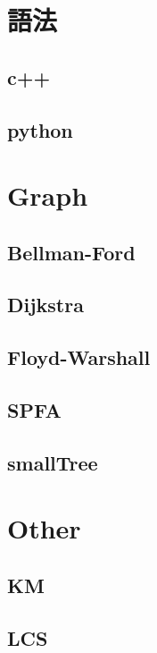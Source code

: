 \section{語法}
    \subsection{c++}
        
    \subsection{python}
        

\section{Graph}
    \subsection{Bellman-Ford}
        
    \subsection{Dijkstra}
        
    \subsection{Floyd-Warshall}
        
    \subsection{SPFA}
        
    \subsection{smallTree}
        

\section{Other}
    \subsection{KM}
        
    \subsection{LCS}
        
